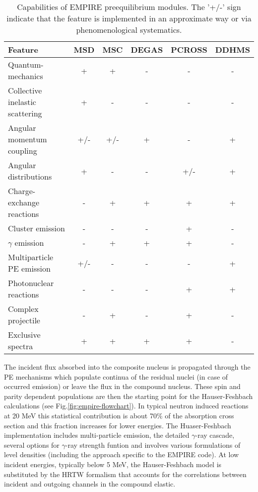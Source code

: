 \documentclass[twocolumn,amsmath,amssymb,10pt,groupedaddress,a4paper]{revtex4}
\begin{document}
\begin{table*}
\caption{\label{tbl:PEcapabilities}Capabilities of EMPIRE preequilibrium modules. The '+/-' sign indicate that the feature is implemented in an approximate way or via phenomenological systematics.}
\begin{tabular}{lccccc}
   \hline
\textbf{Feature}                  &\textbf{MSD }&\textbf{ MSC }&\textbf{ DEGAS }&\textbf{ PCROSS }&\textbf{ DDHMS }   \\
\hline
Quantum-mechanics                &     +     &    +    &     -     &      -     &     -     \\
Collective inelastic scattering   &     +     &    -    &     -     &      -     &     -     \\
Angular momentum coupling         &    +/-    &   +/-   &     +     &      -     &     +     \\
Angular distributions             &     +     &    -    &     -     &     +/-    &     +     \\
Charge-exchange reactions         &     -     &    +    &     +     &      +     &     +     \\
Cluster emission                  &     -     &    -    &     -     &      +     &     -     \\
$\gamma$ emission                 &     -     &    +    &     +     &      +     &     -     \\
Multiparticle PE emission         &    +/-    &    -    &     -     &      -     &     +     \\
Photonuclear reactions            &     -     &    -    &     -     &      +     &     +     \\
Complex projectile                &     -     &    +    &     -     &      +     &     -     \\
Exclusive spectra                 &     +     &    +    &     +     &      +     &     -     \\
\hline
\end{tabular}
\end{table*}

The incident flux absorbed into the composite nucleus is propagated through the PE mechanisms which populate continua of the residual nuclei (in case of occurred emission) or leave the flux in the compound nucleus. These spin and parity dependent populations  are then the starting point for the Hauser-Feshbach calculations (see Fig.\ref{fig:empire-flowchart}). In typical neutron induced reactions at 20 MeV this statistical contribution is  about 70\% of the  absorption cross section and this fraction increases for lower energies. The Huaser-Feshbach implementation includes multi-particle emission, the detailed $\gamma$-ray cascade, several options for $\gamma$-ray strength funtion and involves various formulations of level densities (including the approach specific to the EMPIRE code). At low incident energies, typically below 5 MeV, the Hauser-Feshbach model is substituted by the HRTW formalism that accounts for the correlations between incident and outgoing channels in the compound elastic.
\end{document}
